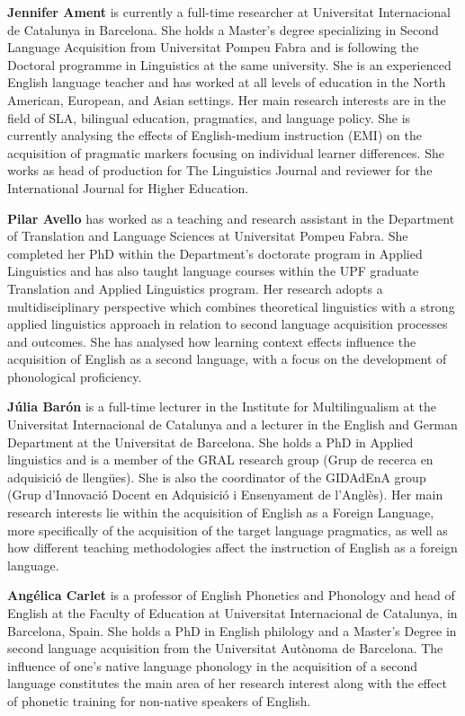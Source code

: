 
\textbf{Jennifer Ament} is currently a full-time researcher at Universitat Internacional de Catalunya in Barcelona. She holds a Master’s degree specializing in Second Language Acquisition from Universitat Pompeu Fabra and is following the Doctoral programme in {Linguistics} at the same university. She is an experienced {English} language teacher and has worked at all levels of education in the North American, European, and Asian settings. Her main research interests are in the field of {SLA}, bilingual education, {pragmatics}, and {language policy}. She is currently analysing the effects of {English}-medium instruction ({EMI}) on the {acquisition} of {pragmatic} markers focusing on individual learner differences. She works as head of production for The {Linguistics} Journal and reviewer for the International Journal for Higher Education. 

\textbf{Pilar Avello} has worked as a teaching and research assistant in the Department of Translation and Language Sciences at Universitat Pompeu Fabra. She completed her PhD within the Department’s doctorate program in Applied {Linguistics} and has also taught language courses within the UPF graduate Translation and Applied {Linguistics} program. Her research adopts a multidisciplinary perspective which combines theoretical linguistics with a strong applied linguistics approach in relation to second language {acquisition} processes and outcomes. She has analysed how {learning context} effects influence the {acquisition} of {English} as a second language, with a focus on the development of {phonological} {proficiency}.

\textbf{Júlia Barón} is a full-time lecturer in the Institute for Multilingualism at the Universitat Internacional de Catalunya and a lecturer in the {English} and {German} Department at the Universitat de Barcelona. She holds a PhD in Applied linguistics and is a member of the GRAL research group (Grup de recerca en adquisició de llengües). She is also the coordinator of the GIDAdEnA group (Grup d'Innovació Docent en Adquisició i Ensenyament de l'Anglès). Her main research interests lie within the {acquisition} of {English} as a Foreign Language, more specifically of the {acquisition} of the {target language} {pragmatics}, as well as how different teaching methodologies affect the instruction of {English} as a {foreign language}.

\newpage 
\textbf{Angélica Carlet} is a professor of {English} Phonetics and Phonology and head of {English} at the Faculty of Education at Universitat Internacional de Catalunya, in Barcelona, Spain. She holds a PhD in {English} philology and a Master’s Degree in second language {acquisition} from the Universitat Autònoma de Barcelona. The influence of one’s native language {phonology} in the {acquisition} of a second language constitutes the main area of her research interest along with the effect of {phonetic} training for non-native speakers of {English}. 

